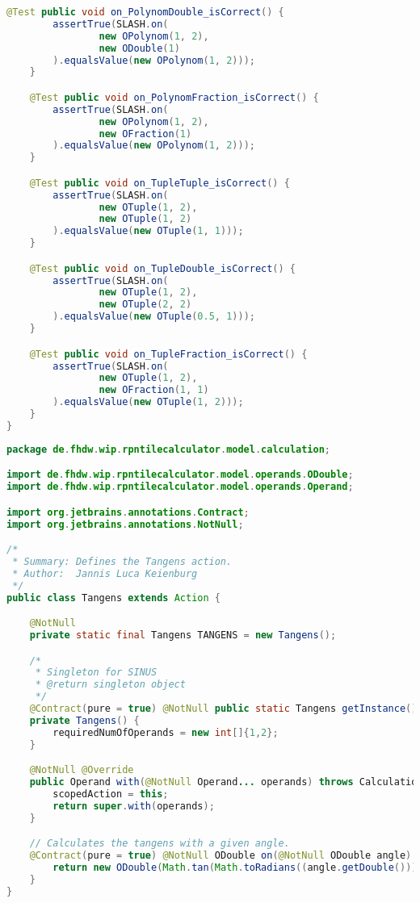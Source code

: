 \begin{lstlisting}[caption=SlashTest (Schwenke),label=list:SlashTest,language=Java]
    @Test public void on_PolynomDouble_isCorrect() {
        assertTrue(SLASH.on(
                new OPolynom(1, 2),
                new ODouble(1)
        ).equalsValue(new OPolynom(1, 2)));
    }

    @Test public void on_PolynomFraction_isCorrect() {
        assertTrue(SLASH.on(
                new OPolynom(1, 2),
                new OFraction(1)
        ).equalsValue(new OPolynom(1, 2)));
    }

    @Test public void on_TupleTuple_isCorrect() {
        assertTrue(SLASH.on(
                new OTuple(1, 2),
                new OTuple(1, 2)
        ).equalsValue(new OTuple(1, 1)));
    }

    @Test public void on_TupleDouble_isCorrect() {
        assertTrue(SLASH.on(
                new OTuple(1, 2),
                new OTuple(2, 2)
        ).equalsValue(new OTuple(0.5, 1)));
    }

    @Test public void on_TupleFraction_isCorrect() {
        assertTrue(SLASH.on(
                new OTuple(1, 2),
                new OFraction(1, 1)
        ).equalsValue(new OTuple(1, 2)));
    }
}
\end{lstlisting}

\begin{lstlisting}[caption=Tangens (Keienburg),label=list:Tangens,language=Java]
package de.fhdw.wip.rpntilecalculator.model.calculation;

import de.fhdw.wip.rpntilecalculator.model.operands.ODouble;
import de.fhdw.wip.rpntilecalculator.model.operands.Operand;

import org.jetbrains.annotations.Contract;
import org.jetbrains.annotations.NotNull;

/*
 * Summary: Defines the Tangens action.
 * Author:  Jannis Luca Keienburg
 */
public class Tangens extends Action {

    @NotNull
    private static final Tangens TANGENS = new Tangens();

    /*
     * Singleton for SINUS
     * @return singleton object
     */
    @Contract(pure = true) @NotNull public static Tangens getInstance() { return TANGENS; }
    private Tangens() {
        requiredNumOfOperands = new int[]{1,2};
    }

    @NotNull @Override
    public Operand with(@NotNull Operand... operands) throws CalculationException {
        scopedAction = this;
        return super.with(operands);
    }

    // Calculates the tangens with a given angle.
    @Contract(pure = true) @NotNull ODouble on(@NotNull ODouble angle) {
        return new ODouble(Math.tan(Math.toRadians((angle.getDouble()))));
    }
}
\end{lstlisting}    

